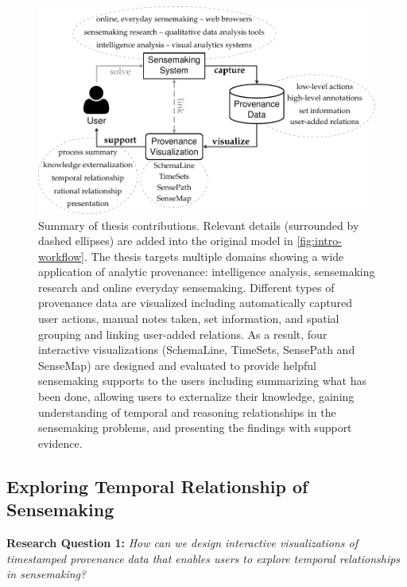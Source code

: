 \begin{figure}
	\centering
	\includegraphics{contribution}
	\caption[Summary of thesis contributions]{Summary of thesis contributions. Relevant details (surrounded by dashed ellipses) are added into the original model in \autoref{fig:intro-workflow}. The thesis targets multiple domains showing a wide application of analytic provenance: intelligence analysis, sensemaking research and online everyday sensemaking. Different types of provenance data are visualized including automatically captured user actions, manual notes taken, set information, and spatial grouping and linking user-added relations. As a result, four interactive visualizations (SchemaLine, TimeSets, SensePath and SenseMap) are designed and evaluated to provide helpful sensemaking supports to the users including summarizing what has been done, allowing users to externalize their knowledge, gaining understanding of temporal and reasoning relationships in the sensemaking problems, and presenting the findings with support evidence.}
	\label{fig:con-contribution}
\end{figure}

\subsection{Exploring Temporal Relationship of Sensemaking}
\textbf{Research Question 1:} \emph{How can we design interactive visualizations of timestamped provenance data that enables users to explore temporal relationships in sensemaking?}

